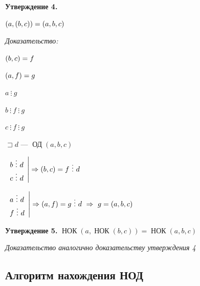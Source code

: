 \documentclass[12pt]{article}
\let\gcd\relax
\DeclareMathOperator{\gcd}{НОД}
\DeclareMathOperator{\cd}{ОД}
\DeclareMathOperator{\lcm}{НОК}
\begin{document}
\textbf{Утверждение 4.}\par
$\gcd(a, \gcd(b,c)) = \gcd (a,b,c)$\par
\textit{Доказательство:}\par
$\gcd(b,c) = f$\par
$\gcd(a,f) = g$\par
$a\ \vdots\ g$\par
$b\ \vdots\ f\ \vdots\ g$\par
$c\ \vdots\ f\ \vdots\ g$\par
$\sqsupset d$ — $\cd(a, b, c)$\par
$\left.\begin{array}{l}
        b\ \vdots\ d \\
        c\ \vdots\ d \\
    \end{array}\right| \Rightarrow \gcd(b, c) = f \ \vdots\ d$

$\left.\begin{array}{l}
        a \ \vdots\ d \\
        f \ \vdots\ d \\
    \end{array}\right| \Rightarrow \gcd(a, f) = g \ \vdots\ d \ \Rightarrow\ g = \gcd(a, b, c)$

\textbf{Утверждение 5.} $\lcm(a,\lcm(b,c)) = \lcm(a,b,c)$\par
\textit{Доказательство аналогично доказательству утверждения 4}\par
\subsection{Алгоритм нахождения НОД}\par
\end{document}
